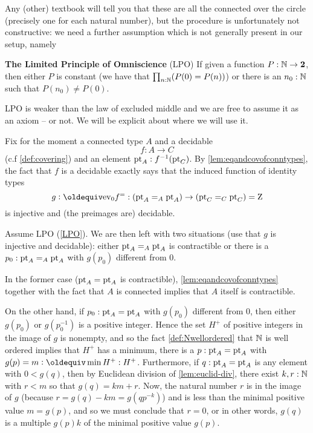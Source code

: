 Any (other) textbook will tell you that these are all the connected \coverings over the circle (precisely one for each natural number), but the procedure is unfortunately not constructive: we need a further assumption which is not generally present in our setup, namely

\begin{principle}
  \label{LPO}
  {\bf The Limited Principle of Omniscience} (LPO)
  If given a function $P:\mathbb{N}\to\mathbf{2}$, then either $P$ is constant (we have that $\prod_{n:\mathbb{N}}(P(0)=P(n))$) or there is an $n_0:\mathbb{N}$ such that $P(n_0)\neq P(0)$.
\end{principle}

LPO is weaker than the law of excluded middle and we are free to assume it as an axiom -- or not.  We will be explicit about where we will use it.


Fix for the moment a connected type $A$ and a decidable \covering 
$$f:A\to C$$ (c.f \cref{def:covering}) and an element ${\mathord{\mathrm{pt}}}_A:f^{-1}({\mathord{\mathrm{pt}}}_C)$.  %
By \cref{lem:eqandcovofconntypes}, the fact that $f$ is a decidable \covering exactly says that the induced function of identity types
$$g\defequi\ev_0f^=:(\pt_A=_A\pt_A)\to (\pt_C=_C\pt_C)=\zet$$ is 
injective and (the preimages are) decidable.    

Assume LPO (\cref{LPO}).  We are then left with two situations (use that $g$ is injective and decidable): either ${\mathord{\mathrm{pt}}}_A=_A{\mathord{\mathrm{pt}}}_A$ is contractible or there is a $p_0:{\mathord{\mathrm{pt}}}_A=_A{\mathord{\mathrm{pt}}}_A$ with $g(p_0)$ different from $0$. 

In the former case (${\mathord{\mathrm{pt}}}_A={\mathord{\mathrm{pt}}}_A$ is contractible), \cref{lem:eqandcovofconntypes} together with the fact that $A$ is connected implies that $A$ itself is contractible.  

On the other hand, if $p_0:{\mathord{\mathrm{pt}}}_A={\mathord{\mathrm{pt}}}_A$ with $g(p_0)$ different from $0$, then either $g(p_0)$ or $g(p_0^{-1})$ is a positive integer.  Hence the set $H^+$ of positive integers in the image of $g$ is nonempty, and so the fact \cref{def:Nwellordered} that $\mathbb{N}$ is well ordered implies that $H^+$ has a minimum, \ie there is a $p:{\mathord{\mathrm{pt}}}_A={\mathord{\mathrm{pt}}}_A$ with  $g(p)=m\defequi\min H^+:H^+$.  Furthermore, if $q:{\mathord{\mathrm{pt}}}_A={\mathord{\mathrm{pt}}}_A$ is any element with $0<g(q)$, then  by Euclidean division of \cref{lem:euclid-div}, there exist $k,r:\mathbb{N}$ with $r<m$ so that $g(q)=km+r$.  Now, the natural number $r$ is in the image of $g$ (because $r=g(q)-km=g(qp^{-k})$) and is less than the minimal positive value $m=g(p)$, and so we must conclude that $r=0$, or in other words, $g(q)$ is a multiple $g(p)k$ of the minimal positive value $g(p)$.


